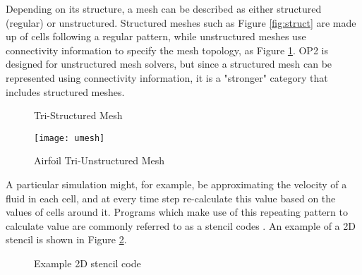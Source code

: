 \clearpage
Depending on its structure, a mesh can be described as either structured (regular) or unstructured. Structured meshes such as Figure \ref{fig:struct} are made up of cells following a regular pattern, while unstructured meshes use connectivity information to specify the mesh topology, as Figure \ref{fig:umesh}. OP2 is designed for unstructured mesh solvers, but since a structured mesh can be represented using connectivity information, it is a "stronger" category that includes structured meshes.
\vspace{.5cm}
\begin{figure}[h!]
  \begin{minipage}{.5\textwidth}
    \centering
    \caption{Tri-Structured Mesh}
    \label{fig:struct}
  \end{minipage}
  \begin{minipage}{.5\textwidth}
    \centering
    \texttt{[image: umesh]}
    \caption{Airfoil Tri-Unstructured Mesh}
    \label{fig:umesh}
  \end{minipage}
\end{figure}
\par
A particular simulation might, for example, be approximating the velocity of a fluid in each cell, and at every time step re-calculate this value based on the values of cells around it. Programs which make use of this repeating pattern to calculate value are commonly referred to as a stencil codes \cite{stencil}. An example of a 2D stencil is shown in Figure \ref{fig:stencil}.
\vspace{.5cm}
\begin{figure}[h!]
  \centering
{}
\caption{Example 2D stencil code}
\label{fig:stencil}
\end{figure}

